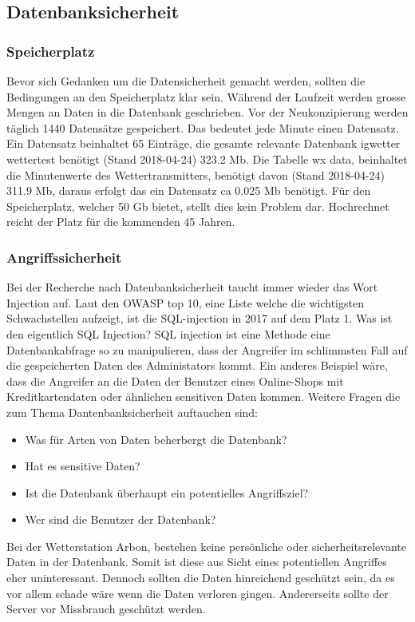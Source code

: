 \subsection{Datenbanksicherheit}
\subsubsection{Speicherplatz}
Bevor sich Gedanken um die Datensicherheit gemacht werden, sollten die Bedingungen an den Speicherplatz klar sein. Während der Laufzeit werden grosse Mengen an Daten in die Datenbank geschrieben. Vor der Neukonzipierung werden täglich 1440 Datensätze gespeichert. Das bedeutet jede Minute einen Datensatz. Ein Datensatz beinhaltet 65 Einträge, die gesamte relevante Datenbank igwetter wettertest benötigt (Stand 2018-04-24) 323.2  Mb. Die Tabelle wx data, beinhaltet die Minutenwerte des Wettertransmitters, benötigt davon (Stand 2018-04-24) 311.9 Mb, daraus erfolgt das ein Datensatz ca 0.025 Mb benötigt. Für den Speicherplatz, welcher 50 Gb bietet, stellt dies kein Problem dar. Hochrechnet reicht der Platz für die kommenden 45 Jahren.

\subsubsection{Angriffssicherheit}
Bei der Recherche nach Datenbanksicherheit taucht immer wieder das Wort Injection auf. Laut den OWASP top 10, eine Liste welche die wichtigsten Schwachstellen aufzeigt, ist die SQL-injection in 2017 auf dem Platz 1. Was ist den eigentlich SQL Injection? SQL injection ist eine Methode eine Datenbankabfrage so zu manipulieren, dass der Angreifer im schlimmsten Fall auf die gespeicherten Daten des Administators kommt. Ein anderes Beispiel wäre, dass die Angreifer an die Daten der Benutzer eines Online-Shops mit Kreditkartendaten oder ähnlichen sensitiven Daten kommen.
Weitere Fragen die zum Thema Dantenbanksicherheit auftauchen sind:
\begin{itemize}
\item Was für Arten von Daten beherbergt die Datenbank?
\item Hat es sensitive Daten?
\item Ist die Datenbank überhaupt ein potentielles Angriffsziel?
\item Wer sind die Benutzer der Datenbank?
\end{itemize}

Bei der Wetterstation Arbon, bestehen keine persönliche oder sicherheitsrelevante Daten in der Datenbank. Somit ist diese aus Sicht eines potentiellen Angriffes eher uninteressant. Dennoch sollten die Daten hinreichend geschützt sein, da es vor allem schade wäre wenn die Daten verloren gingen. Andererseits sollte der Server vor Missbrauch geschützt werden.

